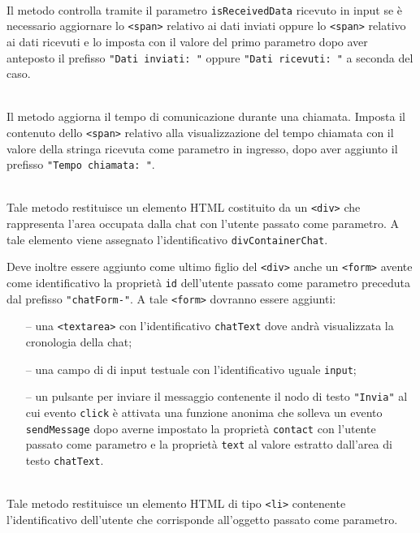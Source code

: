 \begin{description}
  \item{}\\
  Il metodo controlla tramite il parametro \verb'isReceivedData' ricevuto in input se è necessario aggiornare lo \verb'<span>' relativo ai dati inviati oppure lo \verb'<span>' relativo ai dati ricevuti e lo imposta con il valore del primo parametro dopo aver anteposto il prefisso \verb'"Dati inviati: "' oppure \verb'"Dati ricevuti: "' a seconda del caso.

  \item{}\\
  Il metodo aggiorna il tempo di comunicazione durante una chiamata. Imposta il contenuto dello \verb'<span>' relativo alla visualizzazione del tempo chiamata con il valore della stringa ricevuta come parametro in ingresso, dopo aver aggiunto il prefisso \verb'"Tempo chiamata: "'.

  \item{}\\
  Tale metodo restituisce un elemento HTML costituito da un \verb'<div>' che rappresenta l'area occupata dalla chat con l'utente passato come parametro. A tale elemento viene assegnato l'identificativo \verb'divContainerChat'.
  
  Deve inoltre essere aggiunto come ultimo figlio del \verb'<div>' anche un \verb'<form>' avente come identificativo la proprietà \verb'id' dell'utente passato come parametro preceduta dal prefisso \verb'"chatForm-"'. A tale \verb'<form>' dovranno essere aggiunti:
  \begin{itemize}
    \item[--] una \verb'<textarea>' con l'identificativo \verb'chatText' dove andrà visualizzata la cronologia della chat;
    \item[--] una campo di di input testuale con l'identificativo uguale \verb'input';
    \item[--] un pulsante per inviare il messaggio contenente il nodo di testo \verb'"Invia"' al cui evento \verb'click' è attivata una funzione anonima che solleva un evento \verb'sendMessage' dopo averne impostato la proprietà \verb'contact' con l'utente passato come parametro e la proprietà \verb'text' al valore estratto dall'area di testo \verb'chatText'.
  \end{itemize}

  \item{}\\
  Tale metodo restituisce un elemento HTML di tipo \verb'<li>' contenente l'identificativo dell'utente che corrisponde all'oggetto passato come parametro.
  

\end{description}
